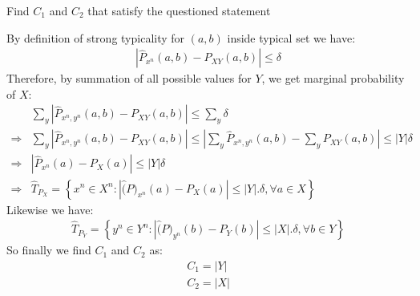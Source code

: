 \documentclass[
  course = {{EE623 Information Theory}},
  quartile = {{4}},
  assignment = 7,
  name = {{Mohammad Mahdi Rahimi}},
  studentnumber = {{20208244}},
  email = {{mahi@kaist.ac.kr}},
  firstexercise = 1
]{aga-homework}
\begin{document}
\exercise
\subexercise Find $C_1$ and $C_2$ that satisfy the questioned statement

By definition of strong typicality for $(a,b)$ inside typical set we have:
\begin{equation} \label{eq8}
\begin{split}
\left|\hat{P}_{x^n}(a,b) - P_{XY}(a,b) \right| \le \delta
\end{split}
\end{equation}
Therefore, by summation of all possible values for $Y$, we get marginal probability of $X$:
\begin{equation} \label{eq9}
\begin{split}
&\sum_y{\left|\hat{P}_{x^n,y^n}(a,b) - P_{XY}(a,b) \right|} \le \sum_y{\delta}\\
\Rightarrow & \sum_y{\left|\hat{P}_{x^n,y^n}(a,b) - P_{XY}(a,b) \right|} \le \left|\sum_y{\hat{P}_{x^n,y^n}(a,b)} - \sum_y{P_{XY}(a,b)} \right| \le |Y|\delta\\
\Rightarrow & \left|\hat{P}_{x^n}(a) - P_{X}(a) \right| \le |Y|\delta\\
\Rightarrow & \hat{T}_{P_X} = \left\{x^n \in X^n : \left| \hat(P)_{x^n}(a) - P_X(a)\right| \le |Y|.\delta, \forall a \in X \right\}
\end{split}
\end{equation}
Likewise we have:
\begin{equation} \label{eq10}
\begin{split}
\hat{T}_{P_Y} = \left\{y^n \in Y^n : \left| \hat(P)_{y^n}(b) - P_Y(b)\right| \le |X|.\delta, \forall b \in Y \right\}
\end{split}
\end{equation}
So finally we find $C_1$ and $C_2$ as:
\begin{equation} \label{eq11}
\begin{split}
C_1 = |Y|\\
C_2 = |X|
\end{split}
\end{equation}
\end{document}
